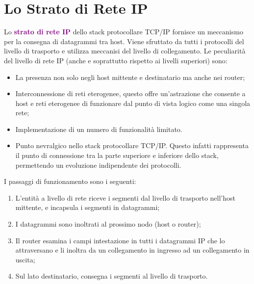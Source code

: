 \newpage
\section{Lo Strato di Rete IP}
Lo \textbf{\textcolor{purple}{strato di rete IP}} dello stack protocollare TCP/IP fornisce un meccanismo per la consegna di datagrammi tra host.
Viene sfruttato da tutti i protocolli del livello di trasporto e utilizza meccanisi del livello di collegamento.
Le peculiarità del livello di rete IP (anche e soprattutto rispetto ai livelli superiori) sono:
\begin{itemize}
    \item La presenza non solo negli host mittente e destinatario ma anche nei router;
    \item Interconnessione di reti eterogenee, questo offre un’astrazione che consente a host e reti eterogenee di funzionare dal punto di vista logico come una singola rete;
    \item Implementazione di un numero di funzionalità limitato.
    \item Punto nevralgico nello stack protocollare TCP/IP. Questo infatti rappresenta il punto di connessione tra la parte superiore e inferiore dello stack, permettendo un evoluzione indipendente dei protocolli. 
\end{itemize}
\newblock
I passaggi di funzionamento sono i seguenti:
\begin{enumerate}
    \item L’entità a livello di rete riceve i segmenti dal livello di trasporto nell’host mittente, e incapsula i segmenti in datagrammi;
    \item I datagrammi sono inoltrati al prossimo nodo (host o router);
    \item Il router esamina i campi intestazione in tutti i datagrammi IP che lo attraversano e li inoltra da un collegamento in ingresso ad un collegamento in uscita;
    \item Sul lato destinatario, consegna i segmenti al livello di trasporto.
\end{enumerate}

